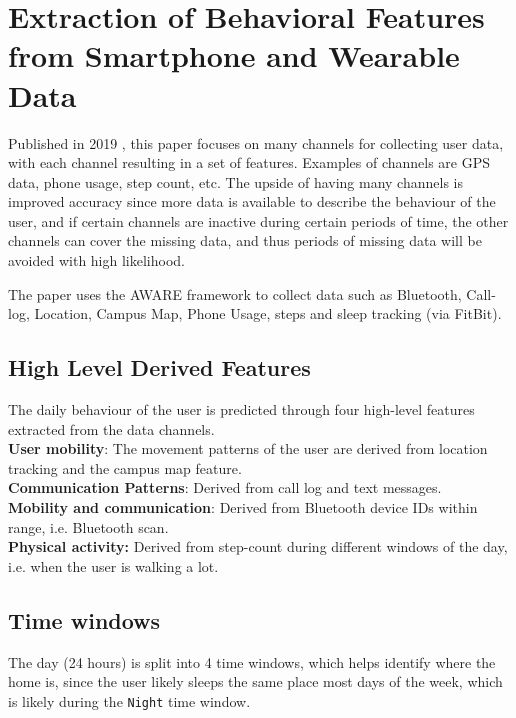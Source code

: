 \section{Extraction of Behavioral Features from Smartphone and Wearable Data}
Published in 2019 \cite{extraction-of-behavioural-features}, this paper focuses on many channels for collecting user data, with each channel resulting in a set of features. Examples of channels are GPS data, phone usage, step count, etc. The upside of having many channels is improved accuracy since more data is available to describe the behaviour of the user, and if certain channels are inactive during certain periods of time, the other channels can cover the missing data, and thus periods of missing data will be avoided with high likelihood. 

The paper uses the AWARE framework \cite{aware2015} to collect data such as  Bluetooth, Call-log, Location, Campus Map, Phone Usage, steps and sleep tracking (via FitBit).

\subsection{High Level Derived Features}
The daily behaviour of the user is predicted through four high-level features extracted from the data channels.\\

\textbf{User mobility}: The movement patterns of the user are derived from location tracking and the campus map feature.\\ 

\textbf{Communication Patterns}: Derived from call log and text messages.\\

\textbf{Mobility and communication}: Derived from Bluetooth device IDs within range, i.e. Bluetooth scan.\\

\textbf{Physical activity:} Derived from step-count during different windows of the day, i.e. when the user is walking a lot.\\

\subsection{Time windows}
The day (24 hours) is split into 4 time windows, which helps identify where the home is, since the user likely sleeps the same place most days of the week, which is likely during the \verb|Night| time window.

